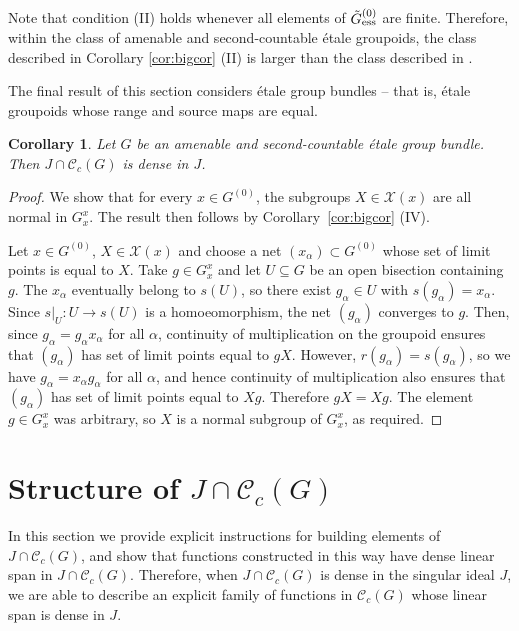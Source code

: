 \documentclass[11pt, oneside, reqno]{amsart}
\newcommand{\Gu}{G^{(0)}}
\newcommand{\cg}{\mathscr{C}_c(G)}
\newcommand{\ess}{{\rm{ess}}}
\newcommand{\tiGu}{\tilde{G}^{(0)}}
\newtheorem{cor}[thm]{Corollary}
\theoremstyle{definition}
\theoremstyle{remark}
\numberwithin{equation}{section}
\begin{document}
Note that condition (II) holds whenever all elements of $\tiGu_\ess$ are finite. Therefore, within the class of amenable and second-countable \'etale groupoids, the class described in Corollary \ref{cor:bigcor} (II) is larger than the class described in \cite[Theorem~4.7]{BGHL}.

\vspace{0.3cm}
The final result of this section considers \'etale group bundles -- that is, \'etale groupoids whose range and source maps are equal.

\begin{cor}\label{cor:BundleOfGroups}
    Let $G$ be an amenable and second-countable \'etale group bundle. Then $J \cap \cg$ is dense in $J$.
\end{cor}

\begin{proof}
    We show that for every $x \in \Gu$, the subgroups $X \in \mathcal{X}(x)$ are all normal in $G^x_x$. The result then follows by Corollary~\ref{cor:bigcor} (IV).

    Let $x \in \Gu$, $X \in \mathcal{X}(x)$ and choose a net $(x_\alpha) \subset \Gu$ whose set of limit points is equal to $X$. Take $g \in G^x_x$ and let $U \subseteq G$ be an open bisection containing $g$. The $x_\alpha$ eventually belong to $s(U)$, so there exist $g_\alpha \in U$ with $s(g_\alpha) = x_\alpha$. Since $s|_U \colon U \to s(U)$ is a homoeomorphism, the net $(g_\alpha)$ converges to $g$. Then, since $g_\alpha = g_\alpha x_\alpha$ for all $\alpha$, continuity of multiplication on the groupoid ensures that $(g_\alpha)$ has set of limit points equal to $gX$. However, $r(g_\alpha) = s(g_\alpha)$, so we have $g_\alpha = x_\alpha g_\alpha$ for all $\alpha$, and hence continuity of multiplication also ensures that $(g_\alpha)$ has set of limit points equal to $Xg$. Therefore $gX = Xg$. The element $g \in G^x_x$ was arbitrary, so $X$ is a normal subgroup of $G^x_x$, as required.
\end{proof}


\section{Structure of $J\cap\cg$}\label{sec:StructureJcg}

In this section we provide explicit instructions for building elements of $J \cap \cg$, and show that functions constructed in this way have dense linear span in $J \cap \cg$. Therefore, when $J \cap \cg$ is dense in the singular ideal $J$, we are able to describe an explicit family of functions in $\cg$ whose linear span is dense in $J$.
\end{document}
